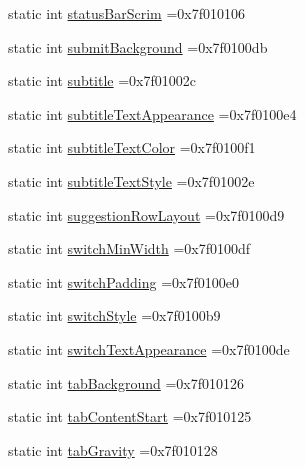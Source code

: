 \begin{DoxyCompactItemize}
\item 
static int \hyperlink{classandroid_1_1support_1_1v7_1_1recyclerview_1_1R_1_1attr_af5dfd94fd12b02dca28ce8629e2f81fb}{status\+Bar\+Scrim} =0x7f010106
\item 
static int \hyperlink{classandroid_1_1support_1_1v7_1_1recyclerview_1_1R_1_1attr_aa40fe069aae9a3cedc2e2e498e2bdb08}{submit\+Background} =0x7f0100db
\item 
static int \hyperlink{classandroid_1_1support_1_1v7_1_1recyclerview_1_1R_1_1attr_a1708411dbd639869fec62a4180dcc279}{subtitle} =0x7f01002c
\item 
static int \hyperlink{classandroid_1_1support_1_1v7_1_1recyclerview_1_1R_1_1attr_ae024e7c9115919d63dff8b958fafd01d}{subtitle\+Text\+Appearance} =0x7f0100e4
\item 
static int \hyperlink{classandroid_1_1support_1_1v7_1_1recyclerview_1_1R_1_1attr_a135168eb14d631fd93d4e8e20e659f73}{subtitle\+Text\+Color} =0x7f0100f1
\item 
static int \hyperlink{classandroid_1_1support_1_1v7_1_1recyclerview_1_1R_1_1attr_a67afe6c327ea30e504856a5e70fff4bb}{subtitle\+Text\+Style} =0x7f01002e
\item 
static int \hyperlink{classandroid_1_1support_1_1v7_1_1recyclerview_1_1R_1_1attr_a16aaf0d7f8d3c6dd3f4dd397baaaea71}{suggestion\+Row\+Layout} =0x7f0100d9
\item 
static int \hyperlink{classandroid_1_1support_1_1v7_1_1recyclerview_1_1R_1_1attr_a871b4626c047732e630fa404ab707920}{switch\+Min\+Width} =0x7f0100df
\item 
static int \hyperlink{classandroid_1_1support_1_1v7_1_1recyclerview_1_1R_1_1attr_acd77a0561bd90ce02c6465d57490ff3a}{switch\+Padding} =0x7f0100e0
\item 
static int \hyperlink{classandroid_1_1support_1_1v7_1_1recyclerview_1_1R_1_1attr_a894c96a3e537952f426b821e0fd073b4}{switch\+Style} =0x7f0100b9
\item 
static int \hyperlink{classandroid_1_1support_1_1v7_1_1recyclerview_1_1R_1_1attr_a0c5fb51c05b4bed3f21785508b70137a}{switch\+Text\+Appearance} =0x7f0100de
\item 
static int \hyperlink{classandroid_1_1support_1_1v7_1_1recyclerview_1_1R_1_1attr_a9e65dd5706c9d76494f42ccf6e532bd8}{tab\+Background} =0x7f010126
\item 
static int \hyperlink{classandroid_1_1support_1_1v7_1_1recyclerview_1_1R_1_1attr_afeab3ba486a1ddbf62801fbf94264b25}{tab\+Content\+Start} =0x7f010125
\item 
static int \hyperlink{classandroid_1_1support_1_1v7_1_1recyclerview_1_1R_1_1attr_ace0c65b266cccf5dbd223b86ae873815}{tab\+Gravity} =0x7f010128

\end{DoxyCompactItemize}
